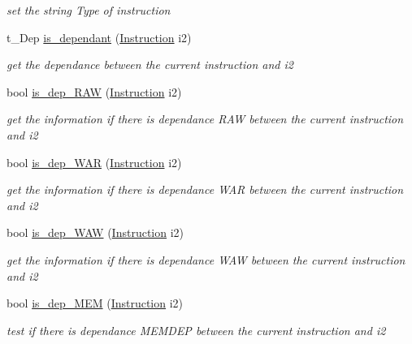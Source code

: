 \begin{DoxyCompactItemize}
\begin{DoxyCompactList}\small\item\em set the string Type of instruction \item\end{DoxyCompactList}\item 
t\_\-Dep \hyperlink{classInstruction_a7e93717c1e9df6fed09105accb6c728c}{is\_\-dependant} (\hyperlink{classInstruction}{Instruction} i2)
\begin{DoxyCompactList}\small\item\em get the dependance between the current instruction and i2 \item\end{DoxyCompactList}\item 
bool \hyperlink{classInstruction_a757d13233614f3b81f340275e0ac03fc}{is\_\-dep\_\-RAW} (\hyperlink{classInstruction}{Instruction} i2)
\begin{DoxyCompactList}\small\item\em get the information if there is dependance RAW between the current instruction and i2 \item\end{DoxyCompactList}\item 
bool \hyperlink{classInstruction_a22c2bbac305649d7f0ec17a04ef217fc}{is\_\-dep\_\-WAR} (\hyperlink{classInstruction}{Instruction} i2)
\begin{DoxyCompactList}\small\item\em get the information if there is dependance WAR between the current instruction and i2 \item\end{DoxyCompactList}\item 
bool \hyperlink{classInstruction_a6fd4dd46f540f0674486d559c1fbcd57}{is\_\-dep\_\-WAW} (\hyperlink{classInstruction}{Instruction} i2)
\begin{DoxyCompactList}\small\item\em get the information if there is dependance WAW between the current instruction and i2 \item\end{DoxyCompactList}\item 
bool \hyperlink{classInstruction_af6cb68b3ab32666559bb81328d43adf9}{is\_\-dep\_\-MEM} (\hyperlink{classInstruction}{Instruction} i2)
\begin{DoxyCompactList}\small\item\em test if there is dependance MEMDEP between the current instruction and i2 \item\end{DoxyCompactList}\item 

\end{DoxyCompactItemize}

